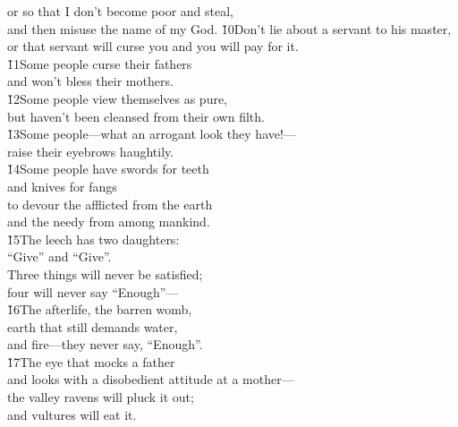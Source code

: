 \begin{poetry}
\poeml or so that I don't become poor and steal, \\
\poemll    and then misuse the name of my God.
\poeml \v{10}Don't lie about a servant to his master, \\
\poemll    or that servant will curse you and you will pay for it. \\
\poeml \v{11}Some people curse their fathers \\
\poemll    and won't bless their mothers. \\
\poeml \v{12}Some people view themselves as pure, \\
\poemll    but haven't been cleansed from their own filth. \\
\poeml \v{13}Some people---what an arrogant look they have!--- \\
\poemll    raise their eyebrows haughtily. \\
\poeml \v{14}Some people have swords for teeth \\
\poemll    and knives for fangs \\
\poeml to devour the afflicted from the earth \\
\poemll    and the needy from among mankind. \\
\poeml \v{15}The leech has two daughters: \\
\poemll    ``Give'' and ``Give''. \\
\poeml Three things will never be satisfied; \\
\poemll    four will never say ``Enough''--- \\
\poeml \v{16}The afterlife, the barren womb, \\
\poemll    earth that still demands water, \\
\poemlll       and fire---they never say, ``Enough''. \\
\poeml \v{17}The eye that mocks a father \\
\poemll    and looks with a disobedient attitude at a mother--- \\
\poeml the valley ravens will pluck it out; \\
\poemll    and vultures will eat it.

\end{poetry}
